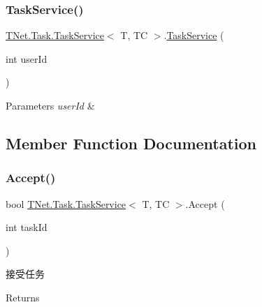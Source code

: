 \subsubsection{\texorpdfstring{Task\+Service()}{TaskService()}}
{\footnotesize\ttfamily \mbox{\hyperlink{class_t_net_1_1_task_1_1_task_service}{T\+Net.\+Task.\+Task\+Service}}$<$ T, TC $>$.\mbox{\hyperlink{class_t_net_1_1_task_1_1_task_service}{Task\+Service}} (\begin{DoxyParamCaption}\item[{int}]{user\+Id }\end{DoxyParamCaption})}






\begin{DoxyParams}{Parameters}
{\em user\+Id} & \\
\hline
\end{DoxyParams}


\subsection{Member Function Documentation}
\mbox{\label{class_t_net_1_1_task_1_1_task_service_a66961e472811a4fa542e61111e2a6272}} 
\subsubsection{\texorpdfstring{Accept()}{Accept()}}
{\footnotesize\ttfamily bool \mbox{\hyperlink{class_t_net_1_1_task_1_1_task_service}{T\+Net.\+Task.\+Task\+Service}}$<$ T, TC $>$.Accept (\begin{DoxyParamCaption}\item[{int}]{task\+Id }\end{DoxyParamCaption})}



接受任务 

\begin{DoxyReturn}{Returns}

\end{DoxyReturn}
\mbox{\label{class_t_net_1_1_task_1_1_task_service_af1fe4f5eb651a1257e735f1a16f4dfad}} 

